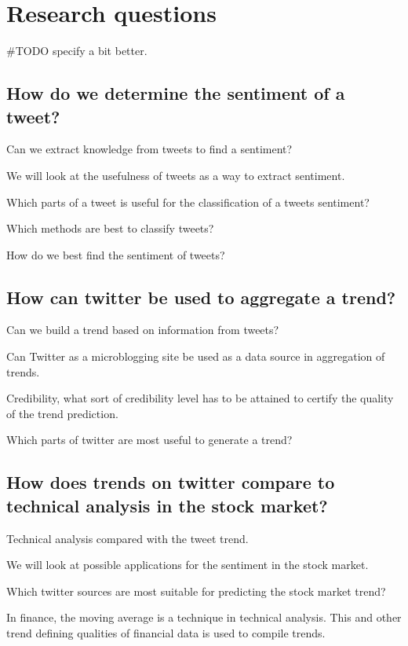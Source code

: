 \section{Research questions}\label{introduction:research_questions}
#TODO specify a bit better.\\ 

\subsection{How do we determine the sentiment of a
tweet?}\label{introduction:rq1}
Can we extract knowledge from tweets to find a sentiment?
	
We will look at the usefulness of tweets as a way to extract sentiment. 

Which parts of a tweet is useful for the classification of a tweets sentiment?

Which methods are best to classify tweets? 

How do we best find the sentiment of tweets?

\subsection{How can twitter be used to aggregate a
trend?}\label{introduction:rq2}
Can we build a trend based on information from tweets? 
 
Can Twitter as a microblogging site be used as a data source in aggregation of trends.

Credibility, what sort of credibility level has to be attained to certify the
quality of the trend prediction. 

Which parts of twitter are most useful to generate a trend?

\subsection{How does trends on twitter compare to technical analysis in the
stock market?}\label{introduction:rq3}
Technical analysis compared with the tweet trend.

We will look at possible applications for the sentiment in the stock market.

Which twitter sources are most suitable for predicting the stock market
trend?

In finance, the moving average is a technique in technical analysis. This and
other trend defining qualities of financial data is used to compile trends. 

